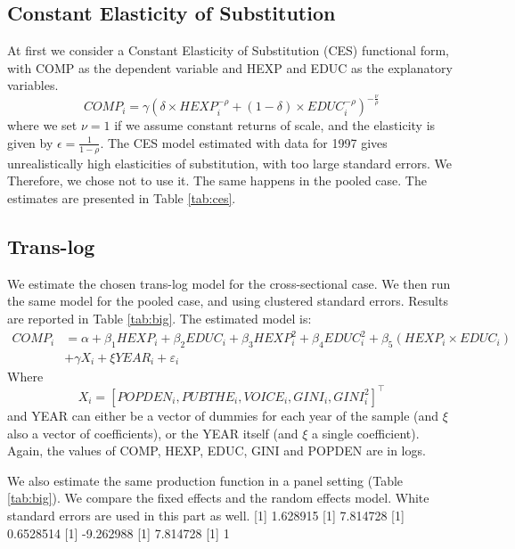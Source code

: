 \documentclass[12pt,a4paper]{article}\usepackage[]{graphicx}\usepackage[]{color}
\begin{document}
\subsection{Constant Elasticity of Substitution}
At first we consider a Constant Elasticity of Substitution (CES) functional form, with COMP as the dependent variable and HEXP and EDUC as the explanatory variables.
\begin{equation}
COMP_i = \gamma \left( \delta \times HEXP_i^{-\rho} + (1- \delta) \times EDUC_i^{-\rho} \right)^{-\frac{\nu}{\rho}}
\end{equation}
where we set $\nu = 1$ if we assume constant returns of scale, and the elasticity is given by $\epsilon = \frac{1}{1- \rho}$. The CES model estimated with data for 1997 gives unrealistically high elasticities of substitution, with too large standard errors. We Therefore, we chose not to use it. The same happens in the pooled case. The estimates are presented in Table \ref{tab:ces}.

\subsection{Trans-log}
We estimate the chosen trans-log model for the cross-sectional case. We then run the same model for the pooled case, and using clustered standard errors. Results are reported in Table \ref{tab:big}. The estimated model is:
\begin{equation}
\begin{aligned}
COMP_i &= \alpha + \beta_1 HEXP_i + \beta_2 EDUC_i + \beta_3 HEXP_i^2 + \beta_4 EDUC_i^2 + \beta_5 \left(HEXP_i \times EDUC_i\right) \\ &+ \gamma X_i + \xi YEAR_i + \varepsilon_i
\end{aligned}
\end{equation}
Where $$ X_i = \left[ POPDEN_i, PUBTHE_i, VOICE_i, GINI_i, GINI_i^2 \right]^\top$$ and YEAR can either be a vector of dummies for each year of the sample (and $\xi$ also a vector of coefficients), or the YEAR itself (and $\xi$ a single coefficient). Again, the values of COMP, HEXP, EDUC, GINI and POPDEN are in logs.


We also estimate the same production function in a panel setting (Table \ref{tab:big}). We compare the fixed effects and the random effects model. White standard errors are used in this part as well.
[1] 1.628915
[1] 7.814728
[1] 0.6528514
[1] -9.262988
[1] 7.814728
[1] 1
\end{document}
